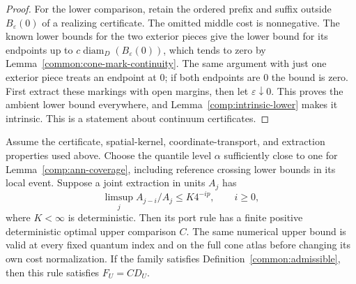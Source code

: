 \begin{proof}
For the lower comparison, retain the ordered prefix and suffix
outside $B_\varepsilon(0)$ of a realizing certificate.  The omitted
middle cost is nonnegative.  The known lower bounds for the two
exterior pieces give the lower bound for its endpoints up to
$c\operatorname{diam}_D(B_\varepsilon(0))$, which tends to zero
by Lemma~\ref{common:cone-mark-continuity}.  The same argument with just one exterior
piece treats an endpoint at $0$; if both endpoints are $0$ the
bound is zero.  First extract these markings with open margins,
then let $\varepsilon\downarrow0$.  This proves the ambient lower
bound everywhere, and Lemma~\ref{comp:intrinsic-lower} makes it
intrinsic.  This is a statement about continuum certificates.
\end{proof}

\begin{proposition}
\label{comp:exact-power-comparison}
Assume the certificate, spatial-kernel, coordinate-transport, and
extraction properties used above.  Choose the quantile level $\alpha$
sufficiently close to one for Lemma~\ref{comp:ann-coverage}, including
reference crossing lower bounds in its local event.  Suppose a joint
extraction in units $A_j$ has
\[
 \limsup_j A_{j-i}/A_j\le K4^{-ip},\qquad i\ge0,
\]
where $K<\infty$ is deterministic.  Then its port rule has a finite
positive deterministic optimal upper comparison $C$.  The same numerical
upper bound is valid at every fixed quantum index and on the full cone
atlas before changing its own cost normalization.  If the family
satisfies Definition~\ref{common:admissible},
then this rule satisfies $F_U=CD_U$.
\end{proposition}

